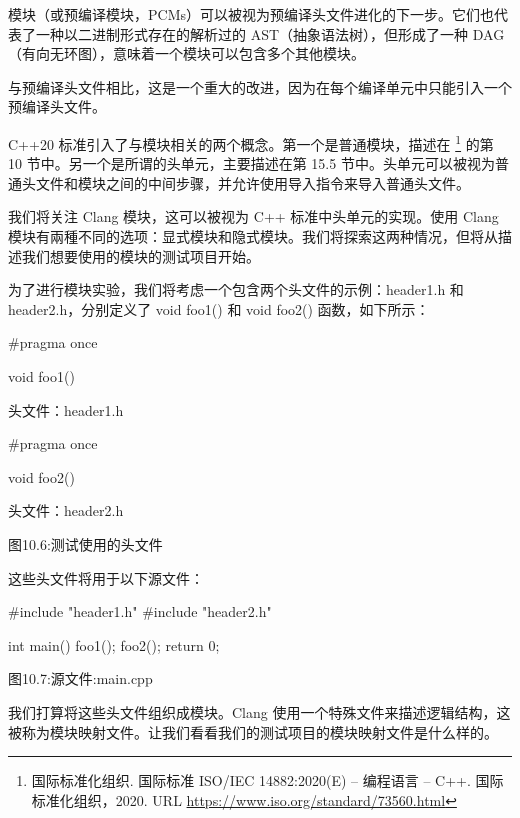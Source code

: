 模块（或预编译模块，PCMs）可以被视为预编译头文件进化的下一步。它们也代表了一种以二进制形式存在的解析过的 AST（抽象语法树），但形成了一种 DAG（有向无环图），意味着一个模块可以包含多个其他模块。

与预编译头文件相比，这是一个重大的改进，因为在每个编译单元中只能引入一个预编译头文件。

C++20 标准引入了与模块相关的两个概念。第一个是普通模块，描述在 \footnote{国际标准化组织. 国际标准 ISO/IEC 14882:2020(E) – 编程语言 – C++. 国际标准化组织，2020. URL \url{https://www.iso.org/standard/73560.html}} 的第 10 节中。另一个是所谓的头单元，主要描述在第 15.5 节中。头单元可以被视为普通头文件和模块之间的中间步骤，并允许使用导入指令来导入普通头文件。

我们将关注 Clang 模块，这可以被视为 C++ 标准中头单元的实现。使用 Clang 模块有兩種不同的选项：显式模块和隐式模块。我们将探索这两种情况，但将从描述我们想要使用的模块的测试项目开始。


为了进行模块实验，我们将考虑一个包含两个头文件的示例：header1.h 和 header2.h，分别定义了 void foo1() 和 void foo2() 函数，如下所示：

\begin{cpp}
#pragma once

void foo1() {}
\end{cpp}

头文件：header1.h

\begin{cpp}
#pragma once

void foo2() {}
\end{cpp}

头文件：header2.h

\begin{center}
图10.6:测试使用的头文件
\end{center}


这些头文件将用于以下源文件：

\begin{cpp}
#include "header1.h"
#include "header2.h"

int main() {
  foo1();
  foo2();
  return 0;
}
\end{cpp}

\begin{center}
图10.7:源文件:main.cpp
\end{center}

我们打算将这些头文件组织成模块。Clang 使用一个特殊文件来描述逻辑结构，这被称为模块映射文件。让我们看看我们的测试项目的模块映射文件是什么样的。

